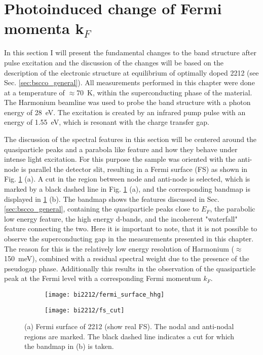\section{Photoinduced change of Fermi momenta k$_F$}
\label{sec:larger_effect}

In this section I will present the fundamental changes to the band structure after pulse excitation and the discussion of the changes will be based on the description of the electronic structure at equilibrium of optimally doped 2212 (see Sec. \ref{sec:bscco_general}).
All measurements performed in this chapter were done at a temperature of $\approx$\qty{70}{\kelvin}, within the superconducting phase of the material.
The Harmonium beamline \cite{arrell_harmonium_2017} was used to probe the band structure with a photon energy of \qty{28}{\electronvolt}.
The excitation is created by an infrared pump pulse with an energy of \qty{1.55}{\electronvolt}, which is resonant with the charge transfer gap.

The discussion of the spectral features in this section will be centered around the quasiparticle peaks and a parabola like feature and how they behave under intense light excitation.
For this purpose the sample was oriented with the anti-node is parallel the detector slit, resulting in a Fermi surface (FS) as shown in Fig. \ref{fig:fs_cut} (a).
A cut in the region between node and anti-node is selected, which is marked by a black dashed line in Fig. \ref{fig:fs_cut} (a), and the corresponding bandmap is displayed in \ref{fig:fs_cut} (b).
The bandmap shows the features discussed in Sec. \ref{sec:bscco_general}, containing the quasiparticle peaks close to $E_F$, the parabolic low energy feature, the high energy  d-bands, and the incoherent "waterfall" feature connecting the two.
Here it is important to note, that it is not possible to observe the superconducting gap in the measurements presented in this chapter.
The reason for this is the relatively low energy resolution of Harmonium ($\approx$\qty{150}{\milli\electronvolt}), combined with a residual spectral weight due to the presence of the pseudogap phase.
Additionally this results in the observation of the quasiparticle peak at the Fermi level with a corresponding Fermi momentum $k_F$.

\begin{figure}[t]
	\centering
	\begin{subfigure}[b]{0.49\textwidth}
		\texttt{[image: bi2212/fermi\_surface\_hhg]}
		\caption{}
	\end{subfigure}
	\begin{subfigure}[b]{0.45\textwidth}
		\texttt{[image: bi2212/fs\_cut]}
		\caption{}
	\end{subfigure}
	\caption{(a) Fermi surface of 2212 (show real FS). The nodal and anti-nodal regions are marked. The black dashed line indicates a cut for which the bandmap in (b) is taken.}
	\label{fig:fs_cut}
\end{figure}

